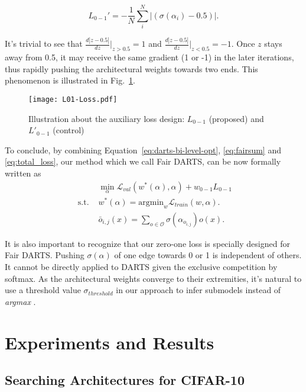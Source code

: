 \documentclass[runningheads]{llncs}
\begin{document}
\begin{equation}
L_{0-1}' = -\frac{1}{N}\sum_{i}^{N}|(\sigma(\alpha_i)-0.5)|.
\end{equation}

It's trivial to see that $\frac{d|z-0.5|}{dz}|_{z>0.5} = 1 $ and $\frac{d|z-0.5|}{dz}|_{z<0.5} = -1 $. Once $z$ stays away from 0.5, it may receive the same gradient (1 or -1) in the later iterations, thus rapidly pushing the architectural weights towards two ends. This phenomenon is illustrated in Fig.~\ref{fig:01los}.

\begin{figure}[ht]
	\centering
	\texttt{[image: L01-Loss.pdf]}
\caption{Illustration about the auxiliary loss design: $L_{0-1}$  (proposed) and $L'_{0-1}$ (control)}
	\label{fig:01los}
\end{figure}

To conclude, by combining Equation~\ref{eq:darts-bi-level-opt}, \ref{eq:fairsum} and \ref{eq:total_loss}, our method which we call Fair DARTS, can be now formally written as
\begin{equation}\label{eq:fairidarts-bi-level-opt}
\begin{split}
&\min_{\alpha} \mathcal{L}_{val} (w^*(\alpha), \alpha) + w_{0-1}L_{0-1} \\
\text{ s.t. } &w^*(\alpha) = \text{argmin}_w  \mathcal{L}_{train} (w, \alpha). \\
&\bar{o}_{i, j} (x)= \sum_{o \in \mathcal{O}} \sigma(\alpha_{o_{i,j}})  o(x).
\end{split}
\end{equation}

It is also important to recognize that our zero-one loss is specially designed for Fair DARTS. Pushing $\sigma(\alpha)$ of one edge towards 0 or 1 is independent of others. It cannot be directly applied to DARTS given the exclusive competition by softmax.  
As the architectural weights converge to their extremities, it's natural to use a threshold value $\sigma_{threshold}$ in our approach to infer submodels instead of \emph{argmax} . 


\section{Experiments and Results}

\subsection{Searching Architectures for CIFAR-10}
\end{document}
